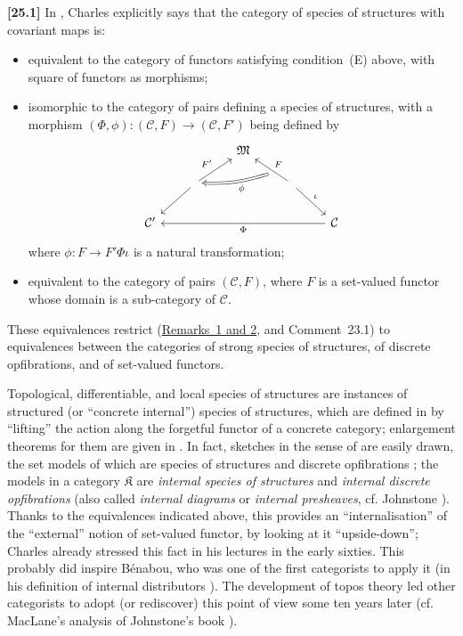 \documentclass[a4paper,fleqn]{article}
\theoremstyle{plain}
\theoremstyle{definition}
\newenvironment{longcomm}[1]
  {\noindent\textbf{[#1]}\rmfamily}
  {}
\newcommand{\CC}{\mathcal{C}}
\newcommand{\MM}{\mathfrak{M}}
\newcommand{\KK}{\mathfrak{K}}
\begin{document}
\begin{longcomm}{25.1}
  In \cite{coll55}, Charles explicitly says that the category of species of structures with covariant maps is:

  \begin{itemize}
    \item equivalent to the category of functors satisfying condition~(E) above, with square of functors as morphisms;

    \item isomorphic to the category of pairs defining a species of structures, with a morphism $(\Phi,\phi)\colon(\CC,F)\to(\CC,F')$ being defined by
      \[
        \begin{tikzcd}
          &&\MM
        \\& \ar[ur,"F'"] \ar[dl]
          && \ar[ul,swap,"F",""{below,name=F}] \ar[dr,"\iota"] \ar[ll,from=F,Rightarrow,bend left=10,"\phi"]
        \\\CC'
          &&&& \CC \ar[llll,"\Phi"]
        \end{tikzcd}
      \]
      where $\phi\colon F\to F'\Phi\iota$ is a natural transformation;

    \item equivalent to the category of pairs $(\CC,F)$, where $F$ is a set-valued functor whose domain is a sub-category of $\CC$.
  \end{itemize}

  These equivalences restrict (\hyperref[remark:i-2]{Remarks~1 and 2}, and Comment~23.1) to equivalences between the categories of strong species of structures, of discrete opfibrations, and of set-valued functors.

  Topological, differentiable, and local species of structures are instances of structured (or ``concrete internal'') species of structures, which are defined in \cite{coll59,coll60} by ``lifting'' the action along the forgetful functor of a concrete category;
  enlargement theorems for them are given in \cite{coll89,coll90,coll95,coll96}.
  In fact, sketches in the sense of \cite{coll106} are easily drawn, the set models of which are species of structures and discrete opfibrations \cite{coll117};
  the models in a category $\KK$ are \emph{internal species of structures} and \emph{internal discrete opfibrations} (also called \emph{internal diagrams} or \emph{internal presheaves}, cf. Johnstone \cite{comm56}).
  Thanks to the equivalences indicated above, this provides an ``internalisation'' of the ``external'' notion of set-valued functor, by looking at it ``upside-down'';
  Charles already stressed this fact in his lectures in the early sixties.
  This probably did inspire Bénabou, who was one of the first categorists to apply it (in his definition of internal distributors \cite{comm7}).
  The development of topos theory led other categorists to adopt (or rediscover) this point of view some ten years later (cf. MacLane's analysis of Johnstone's book \cite{comm75}).
\end{longcomm}
\end{document}
